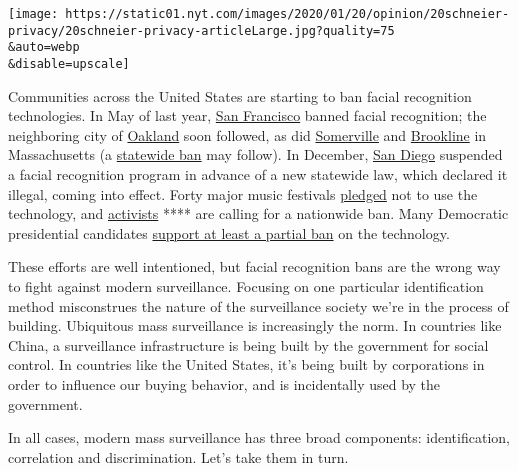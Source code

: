 \texttt{[image: https://static01.nyt.com/images/2020/01/20/opinion/20schneier-privacy/20schneier-privacy-articleLarge.jpg?quality=75\\\&auto=webp\\\&disable=upscale]}

Communities across the United States are starting to ban facial
recognition technologies. In May of last year,
\href{https://www.nytimes.com/2019/05/14/us/facial-recognition-ban-san-francisco.html}{San
Francisco} banned facial recognition; the neighboring city of
\href{https://www.vice.com/en_us/article/zmpaex/oakland-becomes-third-us-city-to-ban-facial-recognition-xz}{Oakland}
soon followed, as did
\href{https://www.bostonglobe.com/metro/2019/06/27/somerville-city-council-passes-facial-recognition-ban/SfaqQ7mG3DGulXonBHSCYK/story.html}{Somerville}
and
\href{https://www.boston.com/news/local-news/2019/12/12/brookline-facial-recognition}{Brookline}
in Massachusetts (a
\href{https://www.aclum.org/en/news/massachusetts-voters-strongly-support-pausing-use-unregulated-face-recognition-technology}{statewide
ban} may follow). In December,
\href{https://www.fastcompany.com/90440198/san-diegos-massive-7-year-experiment-with-facial-recognition-technology-appears-to-be-a-flop}{San
Diego} suspended a facial recognition program in advance of a new
statewide law, which declared it illegal, coming into effect. Forty
major music festivals
\href{https://www.vice.com/en_us/article/ywakpj/40-major-music-festivals-have-pledged-not-to-use-facial-recognition-technology}{pledged}
not to use the technology, and
\href{https://www.banfacialrecognition.com/}{activists} **** are calling
for a nationwide ban. Many Democratic presidential candidates
\href{https://www.vox.com/policy-and-politics/2019/12/3/20965470/2020-presidential-candidates-facial-recognition}{support
at least a partial ban} on the technology.

These efforts are well intentioned, but facial recognition bans are the
wrong way to fight against modern surveillance. Focusing on one
particular identification method misconstrues the nature of the
surveillance society we're in the process of building. Ubiquitous mass
surveillance is increasingly the norm. In countries like China, a
surveillance infrastructure is being built by the government for social
control. In countries like the United States, it's being built by
corporations in order to influence our buying behavior, and is
incidentally used by the government.

In all cases, modern mass surveillance has three broad components:
identification, correlation and discrimination. Let's take them in turn.

